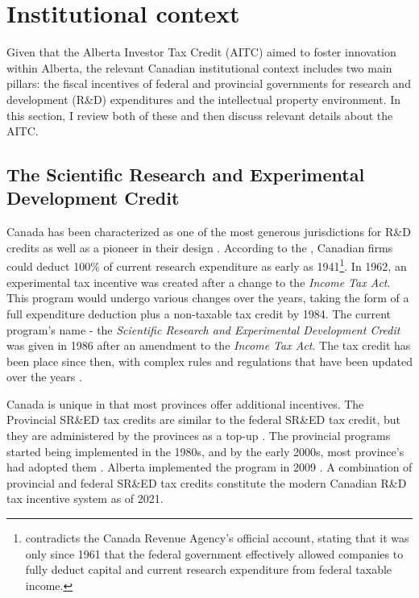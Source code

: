 \documentclass[../main.tex]{subfiles}
\begin{document}
\section{Institutional context}
\label{sec:institutional_background}

Given that the Alberta Investor Tax Credit (AITC) aimed to foster innovation within Alberta, the relevant Canadian institutional context includes two main pillars: the fiscal incentives of federal and provincial governments for research and development (R\&D) expenditures and the intellectual property environment. In this section, I review both of these and then discuss relevant details about the AITC.

\subsection{The Scientific Research and Experimental Development Credit}

Canada has been characterized as one of the most generous jurisdictions for R\&D credits \parencite{mckenzie08} as well as a pioneer in their design \parencite{mansfield_switzer85a}. According to the \textcite{canadarevenueagency23}, Canadian firms could deduct 100\% of current research expenditure as early as 1941\footnote{\textcite{mansfield_switzer85a} contradicts the Canada Revenue Agency's official account, stating that it was only since 1961 that the federal government effectively allowed companies to fully deduct capital and current research expenditure from federal taxable income.}. In 1962, an experimental tax incentive was created after a change to the \textit{Income Tax Act}. This program would undergo various changes over the years, taking the form of a full expenditure deduction plus a non-taxable tax credit by 1984. The current program's name - the \textit{Scientific Research and Experimental Development Credit} was given in 1986 after an amendment to the \textit{Income Tax Act}. The tax credit has been place since then, with complex rules and regulations that have been updated over the years \parencite{canadarevenueagency15}.

Canada is unique in that most provinces offer additional incentives. The Provincial SR\&ED tax credits are similar to the federal SR\&ED tax credit, but they are administered by the provinces as a top-up \parencite{warda00}. The provincial programs started being implemented in the 1980s, and by the early 2000s, most province's had adopted them \parencite{warda98,mckenzie05}. Alberta implemented the program in 2009 \parencite{brouillete13}. A combination of provincial and federal SR\&ED tax credits constitute the modern Canadian R\&D tax incentive system as of 2021.
\end{document}
